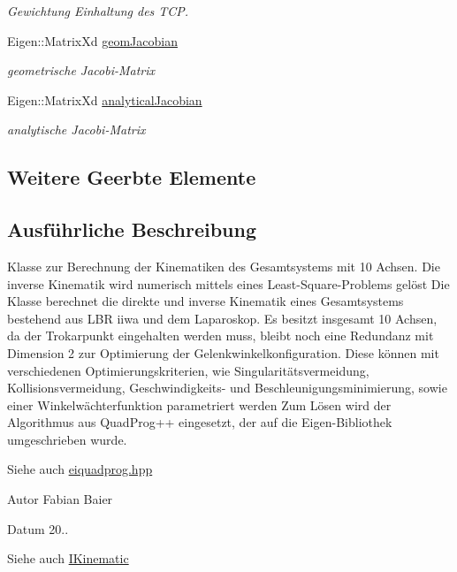 \begin{DoxyCompactItemize}
\begin{DoxyCompactList}\small\item\em Gewichtung Einhaltung des T\-C\-P. \end{DoxyCompactList}\item 
Eigen\-::\-Matrix\-Xd \hyperlink{classNumericKinematic_a3d773d5b89a38a88ed664896fb139f48}{geom\-Jacobian}
\begin{DoxyCompactList}\small\item\em geometrische Jacobi-\/\-Matrix \end{DoxyCompactList}\item 
Eigen\-::\-Matrix\-Xd \hyperlink{classNumericKinematic_ae3fd64a575333037133ede9f2a412f76}{analytical\-Jacobian}
\begin{DoxyCompactList}\small\item\em analytische Jacobi-\/\-Matrix \end{DoxyCompactList}\end{DoxyCompactItemize}
\subsection*{Weitere Geerbte Elemente}


\subsection{Ausführliche Beschreibung}
Klasse zur Berechnung der Kinematiken des Gesamtsystems mit 10 Achsen. Die inverse Kinematik wird numerisch mittels eines Least-\/\-Square-\/\-Problems gelöst Die Klasse berechnet die direkte und inverse Kinematik eines Gesamtsystems bestehend aus L\-B\-R iiwa und dem Laparoskop. Es besitzt insgesamt 10 Achsen, da der Trokarpunkt eingehalten werden muss, bleibt noch eine Redundanz mit Dimension 2 zur Optimierung der Gelenkwinkelkonfiguration. Diese können mit verschiedenen Optimierungskriterien, wie Singularitätsvermeidung, Kollisionsvermeidung, Geschwindigkeits-\/ und Beschleunigungsminimierung, sowie einer Winkelwächterfunktion parametriert werden Zum Lösen wird der Algorithmus aus Quad\-Prog++ eingesetzt, der auf die Eigen-\/\-Bibliothek umgeschrieben wurde. 

\begin{DoxySeeAlso}{Siehe auch}
\hyperlink{eiquadprog_8hpp_source}{eiquadprog.\-hpp}
\end{DoxySeeAlso}
\begin{DoxyAuthor}{Autor}
Fabian Baier 
\end{DoxyAuthor}
\begin{DoxyDate}{Datum}
20.. 
\end{DoxyDate}
\begin{DoxySeeAlso}{Siehe auch}
\hyperlink{classIKinematic}{I\-Kinematic} 
\end{DoxySeeAlso}


